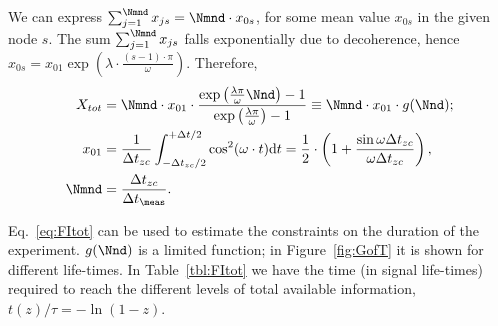 \documentclass{article}
\newcommand{\dt}{\Delta t}
\newcommand{\dtm}{\dt_{\meas}}
\begin{document}
We can express $\sum_{j=1}^{\Nmnd} x_{js} = \Nmnd \cdot x_{0s}$, for some mean value $x_{0s}$ in the given node $s$. The sum $\sum_{j=1}^{\Nmnd} x_{js}$ falls exponentially due to decoherence, hence $x_{0s} = x_{01}\exp{(\lambda\cdot \frac{(s-1)\cdot\pi}{\omega})}$. Therefore,
\begin{align}
	X_{tot} & = \Nmnd\cdot x_{01} \cdot \frac{\exp{\bkt{\frac{\lambda\pi}{\omega}\Nnd}}-1}{\exp{\bkt{\frac{\lambda\pi}{\omega}}}-1} 
	\equiv \Nmnd \cdot x_{01}\cdot g(\Nnd); \label{eq:FItot}\\
	x_{01}  & = \frac{1}{\dtnd}\int_{-\dtnd/2}^{+\dt/2}\cos^2(\omega\cdot t)\td t = \frac12\cdot \bkt{1 + \frac{\sin\omega\dtnd}{\omega\dtnd}},                                    \label{eq:MeanFIZC}   \\
	\Nmnd   & = \frac{\dtnd}{\dtm}. \label{eq:NumMeasNode}
\end{align}

Eq.~\eqref{eq:FItot} can be used to estimate the constraints on the duration of the experiment. $g(\Nnd)$ is a limited function; in Figure~\ref{fig:GofT} it is shown for different life-times. In Table~\ref{tbl:FItot} we have the time (in signal life-times) required to reach the different levels of total available information, $t(z)/\tau = -\ln(1-z)$. 
\end{document}
